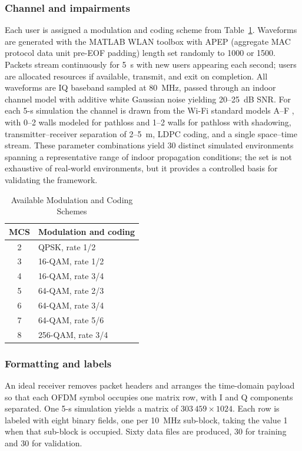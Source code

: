 \documentclass[lettersize,journal]{IEEEtran}
\begin{document}
\subsubsection{\textbf{Channel and impairments}}
Each user is assigned a modulation and coding scheme from
Table~\ref{tab:mcs}. Waveforms are generated with the MATLAB WLAN
toolbox with APEP (aggregate MAC protocol data unit pre-EOF padding) length set
randomly to 1000 or 1500. Packets stream
continuously for 5~s with new users appearing each second; users are
allocated resources if available, transmit, and exit on completion. All
waveforms are IQ baseband sampled at 80~MHz, passed through an indoor
channel model with additive white Gaussian noise yielding 20--25~dB SNR.
For each 5-s simulation the channel is drawn from the Wi-Fi standard
models A--F \cite{Liu2014}, with 0--2 walls modeled for pathloss and
1--2 walls for pathloss with shadowing, transmitter--receiver separation
of 2--5~m, LDPC coding, and a single space--time stream. These parameter
combinations yield 30 distinct simulated environments spanning a
representative range of indoor propagation conditions; the set is not
exhaustive of real-world environments, but it provides a controlled basis for
validating the framework.

\begin{table}[!t]
\centering
\caption{Available Modulation and Coding Schemes}
\label{tab:mcs}
\renewcommand{\arraystretch}{1.15}
\begin{tabular}{@{}cl@{}}
\toprule
\textbf{MCS} & \textbf{Modulation and coding} \\
\midrule
2 & QPSK, rate 1/2 \\
3 & 16-QAM, rate 1/2 \\
4 & 16-QAM, rate 3/4 \\
5 & 64-QAM, rate 2/3 \\
6 & 64-QAM, rate 3/4 \\
7 & 64-QAM, rate 5/6 \\
8 & 256-QAM, rate 3/4 \\
\bottomrule
\end{tabular}
\end{table}

\subsubsection{\textbf{Formatting and labels}}
An ideal receiver removes packet headers and arranges the time-domain
payload so that each OFDM symbol occupies one matrix row, with I and Q
components separated. One 5-s simulation yields a matrix of
$303\,459 \times 1024$. Each row is labeled with eight binary fields, one
per 10~MHz sub-block, taking the value 1 when that sub-block is occupied.
Sixty data files are produced, 30 for training and 30 for validation.
\end{document}
